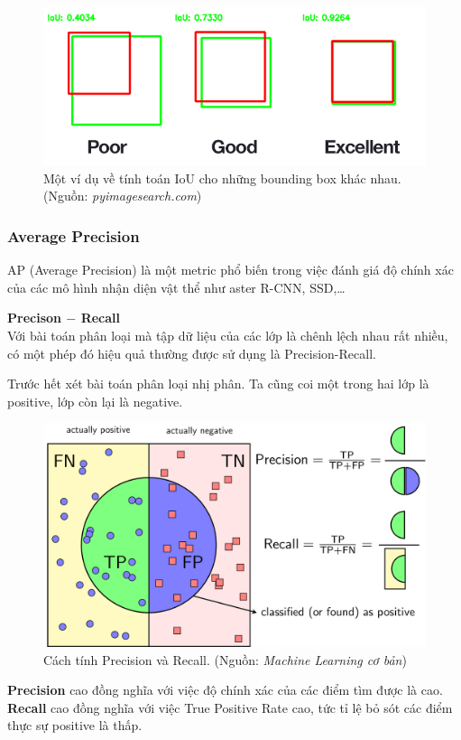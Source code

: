 \documentclass[a4paper, 12pt]{report}
\begin{document}
\begin{figure}[!h]
	\centering
	\includegraphics[width=0.7\linewidth]{Images/iou4}
	\caption{Một ví dụ về tính toán IoU cho những bounding box khác nhau. (Nguồn: \textit{pyimagesearch.com})}
	\label{fig:iou4}
\end{figure}

\subsubsection{Average Precision}
AP (Average Precision) là một metric phổ biến trong việc đánh giá độ chính xác của các mô hình nhận diện vật thể như aster R-CNN, SSD,\dots\par	
\textbf{Precison $-$ Recall}\\
Với bài toán phân loại mà tập dữ liệu của các lớp là chênh lệch nhau rất nhiều, có một phép đó hiệu quả thường được sử dụng là Precision-Recall.\par
Trước hết xét bài toán phân loại nhị phân. Ta cũng coi một trong hai lớp là positive, lớp còn lại là negative.\par
\begin{figure}[!h]
	\centering
	\includegraphics[width=0.7\linewidth]{Images/PR}
	\caption{Cách tính Precision và Recall. (Nguồn: \textit{Machine Learning cơ bản})}
	\label{fig:iou2}
\end{figure}
\textbf{Precision} cao đồng nghĩa với việc độ chính xác của các điểm tìm được là cao. \textbf{Recall} cao đồng nghĩa với việc True Positive Rate cao, tức tỉ lệ bỏ sót các điểm thực sự positive là thấp.\par
\end{document}
